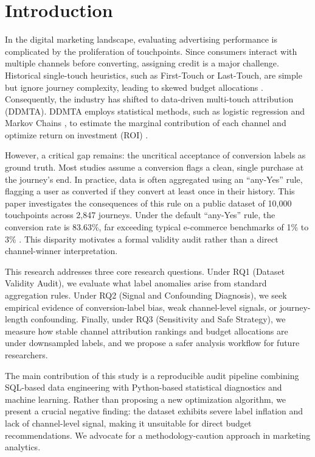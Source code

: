 \documentclass[pdflatex,sn-basic,Numbered]{sn-jnl}
\begin{document}
\section{Introduction}\label{sec:intro}

In the digital marketing landscape, evaluating advertising performance is complicated by the proliferation of touchpoints. Since consumers interact with multiple channels before converting, assigning credit is a major challenge. Historical single-touch heuristics, such as First-Touch or Last-Touch, are simple but ignore journey complexity, leading to skewed budget allocations \cite{shao2011mta,berman2018lasttouch}. Consequently, the industry has shifted to data-driven multi-touch attribution (DDMTA). DDMTA employs statistical methods, such as logistic regression \cite{shao2011mta} and Markov Chains \cite{anderl2016journey}, to estimate the marginal contribution of each channel and optimize return on investment (ROI) \cite{berman2018lasttouch,abhishek2012media}.

However, a critical gap remains: the uncritical acceptance of conversion labels as ground truth. Most studies assume a conversion flags a clean, single purchase at the journey's end. In practice, data is often aggregated using an ``any-Yes'' rule, flagging a user as converted if they convert at least once in their history. This paper investigates the consequences of this rule on a public dataset of 10,000 touchpoints across 2,847 journeys. Under the default ``any-Yes'' rule, the conversion rate is 83.63\%, far exceeding typical e-commerce benchmarks of 1\% to 3\% \cite{irpcommerce2026,shopify2026conversion}. This disparity motivates a formal validity audit rather than a direct channel-winner interpretation.

This research addresses three core research questions. Under RQ1 (Dataset Validity Audit), we evaluate what label anomalies arise from standard aggregation rules. Under RQ2 (Signal and Confounding Diagnosis), we seek empirical evidence of conversion-label bias, weak channel-level signals, or journey-length confounding. Finally, under RQ3 (Sensitivity and Safe Strategy), we measure how stable channel attribution rankings and budget allocations are under downsampled labels, and we propose a safer analysis workflow for future researchers.

The main contribution of this study is a reproducible audit pipeline combining SQL-based data engineering with Python-based statistical diagnostics and machine learning. Rather than proposing a new optimization algorithm, we present a crucial negative finding: the dataset exhibits severe label inflation and lack of channel-level signal, making it unsuitable for direct budget recommendations. We advocate for a methodology-caution approach in marketing analytics.
\end{document}

